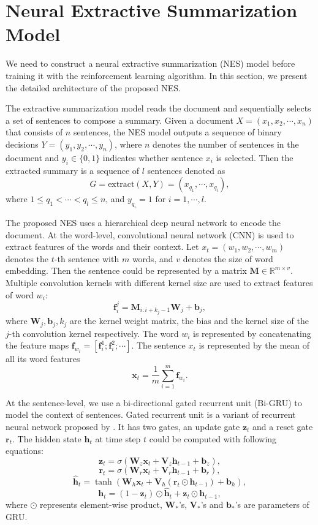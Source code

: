 	\section{Neural Extractive Summarization Model}

	We need to construct a neural extractive summarization (NES) model before training it with the reinforcement learning algorithm. In this section, we present the detailed architecture of the proposed NES.  

	The extractive summarization model reads the document and sequentially selects a set of sentences to compose a summary. Given a document $X=(x_1, x_2, \cdots, x_n)$ that consists of $n$ sentences, the NES model outputs a sequence of binary decisions $Y=(y_1, y_2, \cdots, y_n)$, where $n$ denotes the number of sentences in the document and $y_i \in \{0,1\}$ indicates whether sentence $x_i$ is selected. Then the extracted summary is a sequence of $l$ sentences denoted as
	\[G=\text{extract}(X, Y)=(x_{q_1}, \cdots, x_{q_l}),\]
	where $1\leq q_1 < \cdots < q_l \leq n$, and $y_{q_i} = 1$ for $i=1,\cdots,l$.

	The proposed NES uses a hierarchical deep neural network to encode the document. At the word-level, convolutional neural network (CNN) is used to extract features of the words and their context. Let $x_t=(w_1, w_2, \cdots, w_m)$ denotes the $t$-th sentence with $m$ words, and $v$ denotes the size of word embedding. Then the sentence could be represented by a matrix $\mathbf{M} \in \mathbb{R}^{m \times v}$. Multiple convolution kernels with different kernel size are used to extract features of word $w_i$:
	$$\mathbf{f}_i^j = \mathbf{M}_{i:i+k_j-1} \mathbf{W}_j + \mathbf{b}_j ,$$ where $\mathbf{W}_j, \mathbf{b}_j, k_j$ are the kernel weight matrix, the bias and the kernel size of the $j$-th convolution kernel respectively. The word $w_i$ is represented by concatenating the feature maps $\mathbf{f}_{w_i}=[\mathbf{f}_i^1 ; \mathbf{f}_i^2 ; \cdots]$. The sentence $x_t$ is represented by the mean of all its word features $$ \mathbf{x}_t = \frac{1}{m} \sum_{i=1}^m \mathbf{f}_{w_i} .$$

	At the sentence-level, we use a bi-directional gated recurrent unit (Bi-GRU) to model the context of sentences. Gated recurrent unit is a variant of recurrent neural network proposed by \cite{chung2014empirical}. It has two gates, an update gate $\mathbf{z}_t$ and a reset gate $\mathbf{r}_t$. The hidden state $\mathbf{h}_t$ at time step $t$ could be computed with following equations:
	\[ \mathbf{z}_t = \sigma(\mathbf{W}_{z} \mathbf{x}_t + \mathbf{V}_{z} \mathbf{h}_{t-1}  + \mathbf{b}_{z}) , \]
	\[ \mathbf{r}_t = \sigma(\mathbf{W}_{r} \mathbf{x}_t + \mathbf{V}_{r} \mathbf{h}_{t-1}  + \mathbf{b}_{r}) , \]
	\[ \hat{\mathbf{h}}_t = \tanh(\mathbf{W}_{h} \mathbf{x}_t + \mathbf{V}_{h} (\mathbf{r}_{t} \odot \mathbf{h}_{t-1} ) + \mathbf{b}_{h} ) ,\]
	\[ \mathbf{h}_t = (1 - \mathbf{z}_t) \odot \hat{\mathbf{h}}_{t} +  \mathbf{z}_t \odot \mathbf{h}_{t-1} ,\]
	where $\odot$ represents element-wise product, $\mathbf{W}_{*}$'s, $\mathbf{V}_{*}$'s and $\mathbf{b}_{*}$'s are parameters of GRU. 

